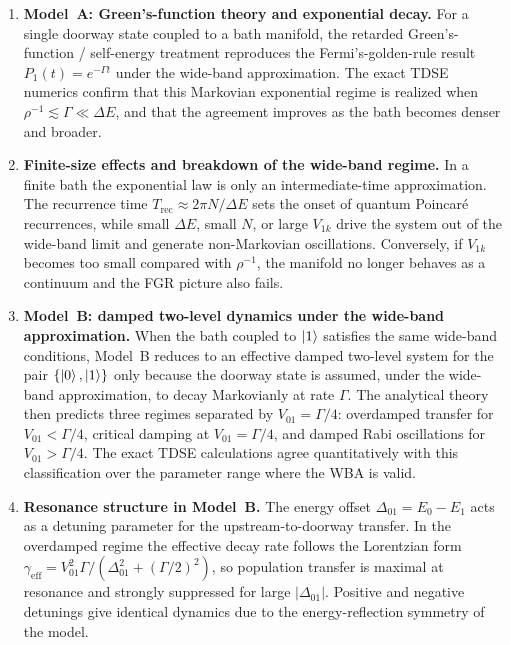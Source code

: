 \documentclass[aps,prx,reprint,showpacs,showkeys,floatfix]{revtex4-2}
\begin{document}
\begin{enumerate}
\item \textbf{Model~A: Green's-function theory and exponential decay.}
For a single doorway state coupled to a bath manifold, the retarded
Green's-function / self-energy treatment reproduces the Fermi's-golden-rule
result $P_1(t)=e^{-\Gamma t}$ under the wide-band approximation.  The exact
TDSE numerics confirm that this Markovian exponential regime is realized
when $\rho^{-1}\lesssim\Gamma\ll\Delta E$, and that the agreement improves
as the bath becomes denser and broader.

\item \textbf{Finite-size effects and breakdown of the wide-band regime.}
In a finite bath the exponential law is only an intermediate-time
approximation.  The recurrence time
$T_{\mathrm{rec}}\approx 2\pi N/\Delta E$ sets the onset of quantum
Poincar\'e recurrences, while small $\Delta E$, small $N$, or large $V_{1k}$
drive the system out of the wide-band limit and generate non-Markovian
oscillations.  Conversely, if $V_{1k}$ becomes too small compared with
$\rho^{-1}$, the manifold no longer behaves as a continuum and the FGR
picture also fails.

\item \textbf{Model~B: damped two-level dynamics under the wide-band approximation.}
When the bath coupled to $\ket{1}$ satisfies the same wide-band conditions,
Model~B reduces to an effective damped two-level system for the pair
$\{\ket{0},\ket{1}\}$ only because the doorway state is assumed, under the
wide-band approximation, to decay Markovianly at rate $\Gamma$.  The
analytical theory then predicts three regimes separated by
$V_{01}=\Gamma/4$: overdamped transfer for $V_{01}<\Gamma/4$, critical
damping at $V_{01}=\Gamma/4$, and damped Rabi oscillations for
$V_{01}>\Gamma/4$.  The exact TDSE calculations agree quantitatively with
this classification over the parameter range where the WBA is valid.

\item \textbf{Resonance structure in Model~B.}
The energy offset $\Delta_{01}=E_0-E_1$ acts as a detuning parameter for the
upstream-to-doorway transfer.  In the overdamped regime the effective decay
rate follows the Lorentzian form
$\gamma_{\mathrm{eff}}=V_{01}^{2}\Gamma/(\Delta_{01}^{2}+(\Gamma/2)^{2})$,
so population transfer is maximal at resonance and strongly suppressed for
large $|\Delta_{01}|$.  Positive and negative detunings give identical
dynamics due to the energy-reflection symmetry of the model.


\end{enumerate}
\end{document}
